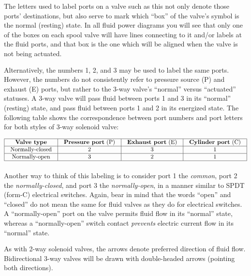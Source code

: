 The letters used to label ports on a valve such as this not only denote those ports' destinations, but also serve to mark which ``box'' of the valve's symbol is the normal (resting) state.  In all fluid power diagrams you will see that only one of the boxes on each spool valve will have lines connecting to it and/or labels at the fluid ports, and that box is the one which will be aligned when the valve is not being actuated.  

\filbreak

Alternatively, the numbers 1, 2, and 3 may be used to label the same ports.  However, the numbers do not consistently refer to pressure source (P) and exhaust (E) ports, but rather to the 3-way valve's ``normal'' versus ``actuated'' statuses.  A 3-way valve will pass fluid between ports 1 and 3 in its ``normal'' (resting) state, and pass fluid between ports 1 and 2 in its energized state.  The following table shows the correspondence between port numbers and port letters for both styles of 3-way solenoid valve:


$$\vbox{\offinterlineskip
\halign{\strut
\vrule \quad\hfil # \ \hfil & 
\vrule \quad\hfil # \ \hfil & 
\vrule \quad\hfil # \ \hfil & 
\vrule \quad\hfil # \ \hfil \vrule \cr
\noalign{\hrule}
%
\textbf{Valve type} & \textbf{Pressure port} (P) & \textbf{Exhaust port} (E) & \textbf{Cylinder port} (C) \cr
%
\noalign{\hrule}
%
Normally-closed & 2 & 3 & 1 \cr
%
\noalign{\hrule}
%
Normally-open & 3 & 2 & 1 \cr
%
\noalign{\hrule}
} %
}$$ %

Another way to think of this labeling is to consider port 1 the \textit{common}, port 2 the \textit{normally-closed}, and port 3 the \textit{normally-open}, in a manner similar to SPDT (form-C) electrical switches.  Again, bear in mind that the words ``open'' and ``closed'' do not mean the same for fluid valves as they do for electrical switches.  A ``normally-open'' port on the valve permits fluid flow in its ``normal'' state, whereas a ``normally-open'' switch contact \textit{prevents} electric current flow in its ``normal'' state.

As with 2-way solenoid valves, the arrows denote preferred direction of fluid flow.  Bidirectional 3-way valves will be drawn with double-headed arrows (pointing both directions).

